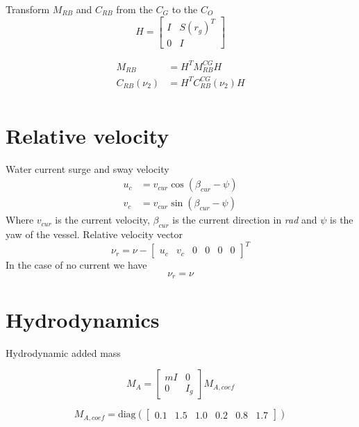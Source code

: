 \documentclass[12pt,a4]{article}
\begin{document}
Transform $M_{RB}$ and $C_{RB}$ from the $C_G$ to the $C_O$
\begin{equation}
	H = \begin{bmatrix} I & S(r_g)^T\\ 0  & I \end{bmatrix}
\end{equation}

\begin{align}
	M_{RB}        & = H^T M_{RB}^{CG} H        \\
	C_{RB}(\nu_2) & = H^T C_{RB}^{CG}(\nu_2) H \\
\end{align}

\section{Relative velocity}
Water current surge and sway velocity
\begin{align}
	u_c & = v_{cur} \cos(\beta_{cur} - \psi) \\
	v_c & = v_{cur} \sin(\beta_{cur} - \psi)
\end{align}
Where $v_{cur}$ is the current velocity, $\beta_{cur}$ is the current direction in \textit{rad} and $\psi$ is the yaw of the vessel.
Relative velocity vector
\begin{equation}
	\nu_r = \nu - \begin{bmatrix}u_c & v_c & 0 & 0 & 0 & 0\end{bmatrix}^T
\end{equation}
In the case of no current we have
\begin{equation}
	\nu_r = \nu
\end{equation}
\section{Hydrodynamics}
Hydrodynamic added mass

\begin{equation}
	M_A =
	\begin{bmatrix}
		mI & 0   \\
		0  & I_g
	\end{bmatrix}
	M_{A,coef}
\end{equation}

\begin{equation}
	M_{A,coef} = \text{diag}\left(\begin{bmatrix}0.1 & 1.5 & 1.0 & 0.2 & 0.8 & 1.7\end{bmatrix}\right)
\end{equation}
\end{document}

